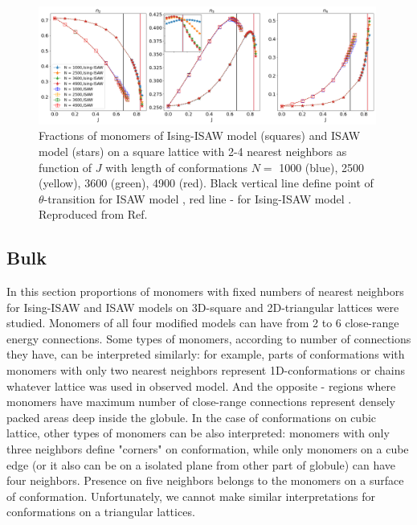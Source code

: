 \begin{figure}
    \centering
    \includegraphics[width=0.99\textwidth]{Images/bulk2-4_inset.png}
    \caption{Fractions of monomers of Ising-ISAW model (squares) and ISAW model (stars) on a square lattice with 2-4 nearest neighbors as function of $J$ with length of conformations $N = $ 1000 (blue), 2500 (yellow), 3600 (green), 4900 (red). Black vertical line define point of $\theta$-transition for ISAW model \cite{Caracciolo2011}, red line - for Ising-ISAW model \cite{faizullina2021critical, Foster2021}. Reproduced from Ref.\cite{faizullina2021critical}}
    \label{fig:Ising_vs_ISAW2D}
\end{figure}

\subsection{Bulk}

In this section proportions of monomers with fixed numbers of nearest neighbors for Ising-ISAW and ISAW models on 3D-square and 2D-triangular lattices were studied. 
Monomers of all four modified models can have from 2 to 6 close-range energy connections. 
Some types of monomers, according to number of connections they have, can be interpreted similarly: for example, parts of conformations with monomers with only two nearest neighbors represent 1D-conformations or chains whatever lattice was used in observed model. 
And the opposite - regions where monomers have maximum number of close-range connections represent densely packed areas deep inside the globule. 
In the case of conformations on cubic lattice, other types of monomers can be also interpreted: monomers with only three neighbors define "corners" on conformation, while only monomers on a cube edge (or it also can be on a isolated plane from other part of globule) can have four neighbors. 
Presence on five neighbors belongs to the monomers on a surface of conformation. 
Unfortunately, we cannot make similar interpretations for conformations on a triangular lattices.

